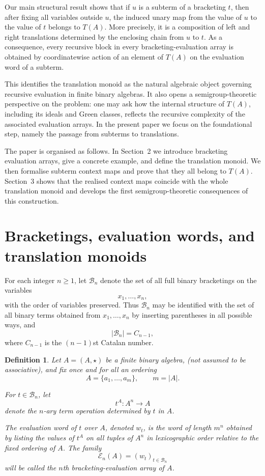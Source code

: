 \documentclass[11pt]{article}
\newtheorem{definition}[theorem]{Definition}
\begin{document}
Our main structural result shows that if \(u\) is a subterm of a bracketing
\(t\), then after fixing all variables outside \(u\), the induced unary map from
the value of \(u\) to the value of \(t\) belongs to \(T(A)\). More precisely,
it is a composition of left and right translations determined by the enclosing
chain from \(u\) to \(t\). As a consequence, every recursive block in every
bracketing-evaluation array is obtained by coordinatewise action of an element
of \(T(A)\) on the evaluation word of a subterm.

This identifies the translation monoid as the natural algebraic object
governing recursive evaluation in finite binary algebras. It also opens a
semigroup-theoretic perspective on the problem: one may ask how the internal
structure of \(T(A)\), including its ideals and Green classes, reflects the recursive 
complexity of the associated evaluation arrays. In the present paper
we focus on the foundational step, namely the passage from subterms to
translations.

The paper is organised as follows. In Section~2 we introduce bracketing
evaluation arrays, give a concrete example, and define the translation monoid.
We then formalise subterm context maps and prove that they all belong to
\(T(A)\). Section~3 shows that the realised context maps coincide with the whole
translation monoid and develops the first semigroup-theoretic consequences of
this construction.



\section{Bracketings, evaluation words, and translation monoids}

For each integer \(n\geq 1\), let \(\mathcal B_n\) denote the set of all full
binary bracketings on the variables
\[
x_1,\dots,x_n,
\]
with the order of variables preserved. Thus \(\mathcal B_n\) may be identified
with the set of all binary terms obtained from \(x_1,\dots,x_n\) by inserting
parentheses in all possible ways, and
\[
|\mathcal B_n|=C_{n-1},
\]
where \(C_{n-1}\) is the \((n-1)\)st Catalan number.

\begin{definition}
Let \(A=(A,\star)\) be a finite binary algebra, (not assumed to be associative), and fix once and for all an
ordering
\[
A=\{a_1,\dots,a_m\},
\qquad m=|A|.
\]

For \(t\in\mathcal B_n\), let
\[
t^A:A^n\to A
\]
denote the \(n\)-ary term operation determined by \(t\) in \(A\).

The \emph{evaluation word} of \(t\) over \(A\), denoted \(w_t\), is the word of
length \(m^n\) obtained by listing the values of \(t^A\) on all tuples of
\(A^n\) in lexicographic order relative to the fixed ordering of \(A\). The
family
\[
\mathcal E_n(A)=(w_t)_{t\in \mathcal B_n}
\]
will be called the \emph{\(n\)th bracketing-evaluation array} of \(A\).
\end{definition}
\end{document}
